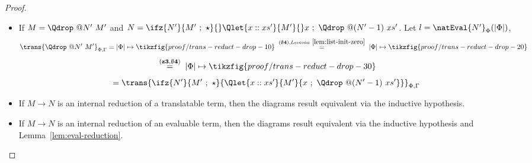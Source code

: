 \begin{proof}
\begin{itemize}
                \rrbracket_{\Phi,\Gamma,\Delta}
            \)
        \item If $M = \Qdrop\ @N'\ M'$ and \(N=
            \ifz{N'}{M'\ ;\ \star}{} \Qlet{x :: xs'}{M'}{} x\ ;\ \Qdrop\ @(N'-1)\ xs'
            \). Let $l = \natEval{N'}_\Phi(|\Phi|)$,
            \[
                \trans{\Qdrop\ @N'\ M'}_{\Phi,\Gamma}
                =
                |\Phi|\mapsto\tikzfig{proof/trans-reduct-drop-10}
                \;\overset{\scriptstyle{{\bf(\emptyset 4)},Lemma~\ref{lem:list-init-zero}}}{=}\;
                |\Phi|\mapsto\tikzfig{proof/trans-reduct-drop-20}
            \]
            \[
                \;\overset{\scriptstyle{{\bf(z3,\emptyset 4)}}}{=}\;
                |\Phi|\mapsto\tikzfig{proof/trans-reduct-drop-30}
            \]
            \[
                =
                \trans{\ifz{N'}{M'\ ;\ \star}{\Qlet{x :: xs'}{M'}{x\ ;\ \Qdrop\ @(N'-1)\ xs'}}}_{\Phi,\Gamma}
            \]
        \item If $M \to N$ is an internal reduction of a translatable term,
            then the diagrams result equivalent via the inductive hypothesis.
        \item If $M \to N$ is an internal reduction of an evaluable term,
            then the diagrams result equivalent via the inductive hypothesis
            and Lemma~\ref{lem:eval-reduction}.
    \end{itemize}
\end{proof}